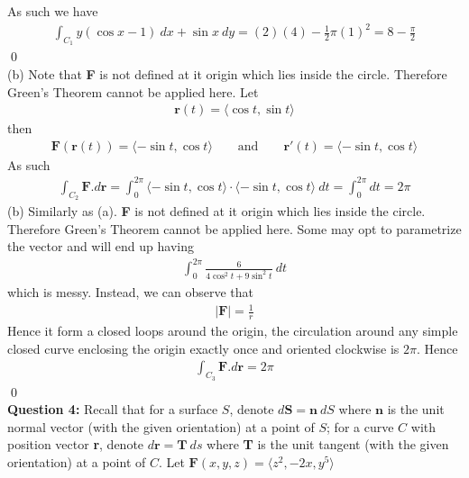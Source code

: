 \documentclass[12pt]{article}
\begin{document}
As such we have
\begin{align*}
     \int_{C_1} y(\cos x-1)\ dx+\sin x\ dy=(2)(4)-\frac{1}{2}\pi(1)^2=8-\frac{\pi}{2}
\end{align*}\qed\\[2em]
(b) Note that \textbf{F} is not defined at it origin which lies inside the circle. Therefore Green's Theorem cannot be applied here. Let
\begin{align*}
    \textbf{r}(t)=\langle\cos t,\sin t\rangle
\end{align*}
then
\begin{align*}
    \textbf{F}(\textbf{r}(t))=\langle-\sin t,\cos t\rangle\qquad\text{and}\qquad \textbf{r}'(t)= \langle-\sin t,\cos t\rangle
\end{align*}
As such 
\begin{align*}
    \int_{C_2}\textbf{F}.d\textbf{r}=\int_0^{2\pi}\langle-\sin t,\cos t\rangle\cdot\langle-\sin t,\cos t\rangle\ dt=\int_0^{2\pi}dt=2\pi
\end{align*}
(b) Similarly as (a). \textbf{F} is not defined at it origin which lies inside the circle. Therefore Green's Theorem cannot be applied here. Some may opt to parametrize the vector and will end up having
\begin{align*}
    \int_0^{2\pi} \frac{6}{4\cos^2 t+9\sin^2 t}\ dt
\end{align*}
which is messy. Instead, we can observe that 
\begin{align*}
    |\textbf{F}|=\frac{1}{r}
\end{align*}
Hence it form a closed loops around the origin, the circulation around any simple closed curve enclosing the origin exactly once and oriented clockwise is $2\pi$. Hence
\begin{align*}
    \int_{C_3}\textbf{F}.d\textbf{r}=2\pi
\end{align*}\qed\\[2em]
\textbf{Question 4:} Recall that for a surface $S$, denote $d\textbf{S}=\textbf{n}\ dS$ where $\textbf{n}$ is the unit normal vector (with the given orientation) at a point of $S$; for a curve $C$ with position vector \textbf{r}, denote $d\textbf{r}=\textbf{T}\ ds$ where \textbf{T} is the unit tangent (with the given orientation) at a point of $C$. Let $\textbf{F}(x,y,z)=\langle z^2,-2x,y^5\rangle$
\end{document}
